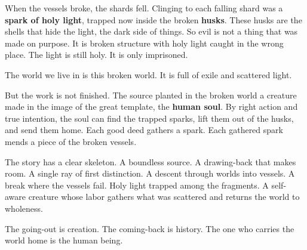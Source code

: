 When the vessels broke, the shards fell. Clinging to each falling shard was a
\textbf{spark of holy light}, trapped now inside the broken \textbf{husks}.
These husks are the shells that hide the light, the dark side of things. So evil is
not a thing that was made on purpose. It is broken structure with holy light caught
in the wrong place. The light is still holy. It is only imprisoned.

The world we live in is this broken world. It is full of exile and scattered light.

But the work is not finished. The source planted in the broken world a creature
made in the image of the great template, the \textbf{human soul}. By right action
and true intention, the soul can find the trapped sparks, lift them out of the
husks, and send them home. Each good deed gathers a spark. Each gathered spark mends
a piece of the broken vessels.

The story has a clear skeleton. A boundless source. A drawing-back that makes room.
A single ray of first distinction. A descent through worlds into vessels. A break
where the vessels fail. Holy light trapped among the fragments. A self-aware
creature whose labor gathers what was scattered and returns the world to wholeness.

The going-out is creation. The coming-back is history. The one who carries the
world home is the human being.
